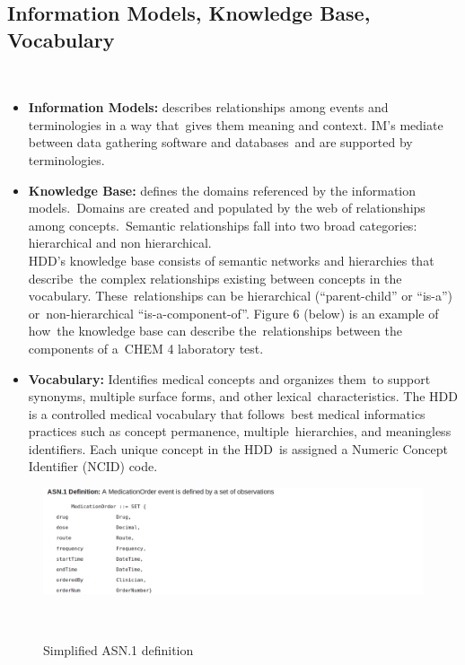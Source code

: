   \subsection{Information Models, Knowledge Base, Vocabulary}\
  \begin{itemize}
    \itemsep0ex
    \item  \textbf{Information Models:} describes relationships among events and terminologies in a way that\
    gives them meaning and context. IM's mediate between data gathering software and databases\
    and are supported by terminologies.\\

    \item  \textbf{Knowledge Base:} defines the domains referenced by the information models.\
    Domains are created and populated by the web of relationships among concepts.\
    Semantic relationships fall into two broad categories: hierarchical and non hierarchical.\\

    \noindent HDD's knowledge base consists of semantic networks and hierarchies that describe\
    the complex relationships existing between concepts in the vocabulary. These\
    relationships can be hierarchical (``parent-child'' or ``is-a'') or\ 
    non-hierarchical ``is-a-component-of''. Figure 6 (below) is an example of how\
    the knowledge base can describe the\ relationships between the components of a\
    CHEM 4 laboratory test. \citep{_3M_HDD_Product_Overview_2010}\

    \item \textbf{Vocabulary:} Identifies medical concepts and organizes them\
    to support synonyms, multiple surface forms, and other lexical\
    characteristics. The HDD is a controlled medical vocabulary that follows\
    best medical informatics practices such as concept permanence, multiple\
    hierarchies, and meaningless identifiers. Each unique concept in the HDD\
    is assigned a Numeric Concept Identifier (NCID) code. \citep{_3M_HDD_Product_Overview_2010}\
  \end{itemize}

  \begin{figure}[ht!]
    \label{fig:asn}
    \centering
    \includegraphics[scale=0.4,trim=1 1 400 1,clip]{asn.png}
    \caption{Simplified ASN.1 definition}\
    \citep{_3M_HDD_Product_Overview_2010}\
  \end{figure}  

